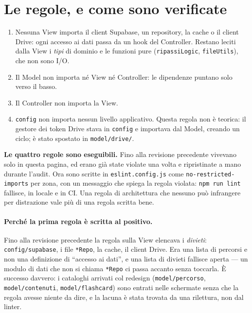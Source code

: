 \documentclass[11pt,a4paper]{report}
\begin{document}
\section{Le regole, e come sono verificate}

\begin{enumerate}[nosep]
  \item Nessuna View importa il client Supabase, un repository, la cache o il
        client Drive: ogni accesso ai dati passa da un hook del Controller.
        Restano leciti dalla View i \emph{tipi} di dominio e le funzioni pure
        (\texttt{ripassiLogic}, \texttt{fileUtils}), che non sono I/O.
  \item Il Model non importa n\'e View n\'e Controller: le dipendenze puntano
        solo verso il basso.
  \item Il Controller non importa la View.
  \item \texttt{config} non importa nessun livello applicativo. Questa regola
        non \`e teorica: il gestore dei token Drive stava in \texttt{config} e
        importava dal Model, creando un ciclo; \`e stato spostato in
        \texttt{model/drive/}.
\end{enumerate}

\textbf{Le quattro regole sono eseguibili.} Fino alla revisione precedente
vivevano solo in questa pagina, ed erano gi\`a state violate una volta e
ripristinate a mano durante l'audit. Ora sono scritte in
\texttt{eslint.config.js} come \texttt{no-restricted-imports} per zona, con un
messaggio che spiega la regola violata: \texttt{npm run lint} fallisce, in
locale e in CI. Una regola di architettura che nessuno pu\`o infrangere per
distrazione vale pi\`u di una regola scritta bene.

\paragraph{Perch\'e la prima regola \`e scritta al positivo.} Fino alla
revisione precedente la regola sulla View elencava i \emph{divieti}:
\texttt{config/supabase}, i file \texttt{*Repo}, la cache, il client Drive. Era
una lista di percorsi e non una definizione di ``accesso ai dati'', e una lista
di divieti fallisce aperta — un modulo di dati che non si chiama \texttt{*Repo}
ci passa accanto senza toccarla. \`E successo davvero: i cataloghi arrivati col
redesign (\texttt{model/percorso}, \texttt{model/contenuti},
\texttt{model/flashcard}) sono entrati nelle schermate senza che la regola
avesse niente da dire, e la lacuna \`e stata trovata da una rilettura, non dal
linter.
\end{document}
